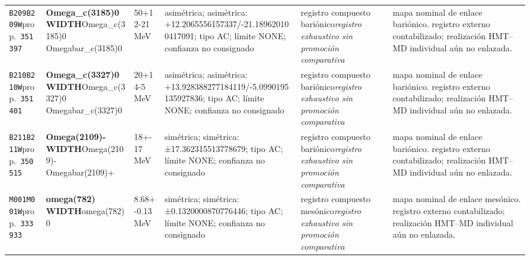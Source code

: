 \begin{landscape}
\begin{longtable}{L{1.85cm}L{4.45cm}L{2.35cm}L{4.05cm}L{3.35cm}L{7.15cm}}
\texttt{B209}\newline \texttt{B209W}\newline prop.\ \texttt{351397} & \textbf{Omega\_\allowbreak{}c(3185)0 WIDTH}\newline Omega\_\allowbreak{}c(3185)0 \textbar{}\allowbreak{} Omegabar\_\allowbreak{}c(3185)0 & 50+12-21\,MeV & asimétrica; asimétrica: +12.2065556157337/-21.189620100417091; tipo AC; límite NONE; confianza no consignado & registro compuesto bariónico\newline \emph{registro exhaustivo sin promoción comparativa} & mapa nominal de enlace bariónico. registro externo contabilizado; realización HMT--MD individual aún no enlazada. \\
\texttt{B210}\newline \texttt{B210W}\newline prop.\ \texttt{351401} & \textbf{Omega\_\allowbreak{}c(3327)0 WIDTH}\newline Omega\_\allowbreak{}c(3327)0 \textbar{}\allowbreak{} Omegabar\_\allowbreak{}c(3327)0 & 20+14-5\,MeV & asimétrica; asimétrica: +13.928388277184119/-5.0990195135927836; tipo AC; límite NONE; confianza no consignado & registro compuesto bariónico\newline \emph{registro exhaustivo sin promoción comparativa} & mapa nominal de enlace bariónico. registro externo contabilizado; realización HMT--MD individual aún no enlazada. \\
\texttt{B211}\newline \texttt{B211W}\newline prop.\ \texttt{350515} & \textbf{Omega(2109)- WIDTH}\newline Omega(2109)- \textbar{}\allowbreak{} Omegabar(2109)+ & 18+-17\,MeV & simétrica; simétrica: ±17.362315513778679; tipo AC; límite NONE; confianza no consignado & registro compuesto bariónico\newline \emph{registro exhaustivo sin promoción comparativa} & mapa nominal de enlace bariónico. registro externo contabilizado; realización HMT--MD individual aún no enlazada. \\
\texttt{M001}\newline \texttt{M001W}\newline prop.\ \texttt{333933} & \textbf{omega(782) WIDTH}\newline omega(782)0 & 8.68+-0.13\,MeV & simétrica; simétrica: ±0.1320000870776446; tipo AC; límite NONE; confianza no consignado & registro compuesto mesónico\newline \emph{registro exhaustivo sin promoción comparativa} & mapa nominal de enlace mesónico. registro externo contabilizado; realización HMT--MD individual aún no enlazada. \\

\end{longtable}
\end{landscape}
